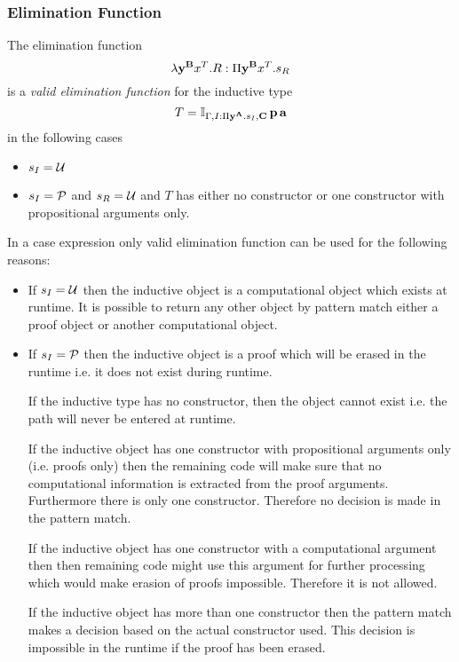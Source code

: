 \subsubsection{Elimination Function}

\begin{definition}
  The elimination function
  $$
  \lambda \mathbf{y}^{\mathbf{B}} x^T.R : \Pi \mathbf{y}^{\mathbf{B}} x^T . s_R
  $$
  is a
  \emph{valid elimination function}
  for the inductive type
  $$
  T = \mathbb{I}_{\Gamma,I:\Pi \mathbf{y}^{\mathbf{A}}.s_I,\mathbf{C}} \, \mathbf{p} \,
  \mathbf{a}
  $$
  in the following cases
  \begin{itemize}

  \item $s_I = {\cal{U}}$

  \item $s_I = {\cal{P}}$ and $s_R = {\cal{U}}$ and $T$ has either no constructor or
    one constructor with propositional arguments only.

  \end{itemize}
\end{definition}
In a case expression only valid elimination function can be used for the
following reasons:
\begin{itemize}

\item If $s_I = {\cal{U}}$ then the inductive object is a computational object
  which exists at runtime. It is possible to return any other object by
  pattern match either a proof object or another computational object.

\item If $s_I = {\cal{P}}$ then the inductive object is a proof which will be
  erased in the runtime i.e. it does not exist during runtime.

  If the inductive type has no constructor, then the object cannot exist
  i.e. the path will never be entered at runtime.

  If the inductive object has one constructor with propositional arguments
  only (i.e. proofs only) then the remaining code will make sure that no
  computational information is extracted from the proof arguments. Furthermore
  there is only one constructor. Therefore no decision is made in the pattern
  match.

  If the inductive object has one constructor with a computational argument
  then then remaining code might use this argument for further processing
  which would make erasion of proofs impossible. Therefore it is not allowed.

  If the inductive object has more than one constructor then the pattern match
  makes a decision based on the actual constructor used. This decision is
  impossible in the runtime if the proof has been erased.
\end{itemize}




